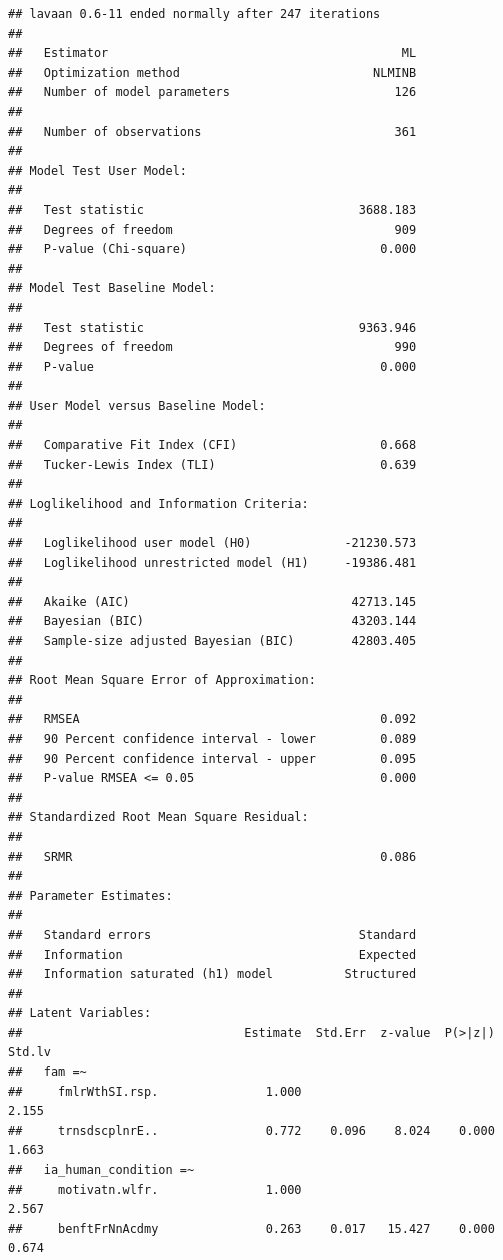 \documentclass[
]{article}
\begin{document}
\begin{verbatim}
## lavaan 0.6-11 ended normally after 247 iterations
## 
##   Estimator                                         ML
##   Optimization method                           NLMINB
##   Number of model parameters                       126
##                                                       
##   Number of observations                           361
##                                                       
## Model Test User Model:
##                                                       
##   Test statistic                              3688.183
##   Degrees of freedom                               909
##   P-value (Chi-square)                           0.000
## 
## Model Test Baseline Model:
## 
##   Test statistic                              9363.946
##   Degrees of freedom                               990
##   P-value                                        0.000
## 
## User Model versus Baseline Model:
## 
##   Comparative Fit Index (CFI)                    0.668
##   Tucker-Lewis Index (TLI)                       0.639
## 
## Loglikelihood and Information Criteria:
## 
##   Loglikelihood user model (H0)             -21230.573
##   Loglikelihood unrestricted model (H1)     -19386.481
##                                                       
##   Akaike (AIC)                               42713.145
##   Bayesian (BIC)                             43203.144
##   Sample-size adjusted Bayesian (BIC)        42803.405
## 
## Root Mean Square Error of Approximation:
## 
##   RMSEA                                          0.092
##   90 Percent confidence interval - lower         0.089
##   90 Percent confidence interval - upper         0.095
##   P-value RMSEA <= 0.05                          0.000
## 
## Standardized Root Mean Square Residual:
## 
##   SRMR                                           0.086
## 
## Parameter Estimates:
## 
##   Standard errors                             Standard
##   Information                                 Expected
##   Information saturated (h1) model          Structured
## 
## Latent Variables:
##                               Estimate  Std.Err  z-value  P(>|z|)   Std.lv
##   fam =~                                                                  
##     fmlrWthSI.rsp.               1.000                               2.155
##     trnsdscplnrE..               0.772    0.096    8.024    0.000    1.663
##   ia_human_condition =~                                                   
##     motivatn.wlfr.               1.000                               2.567
##     benftFrNnAcdmy               0.263    0.017   15.427    0.000    0.674

\end{verbatim}
\end{document}
